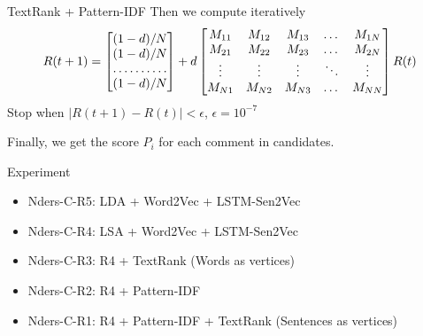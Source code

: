 \documentclass[aspectratio=169]{beamer}
\begin{document}
    \begin{frame}{TextRank + Pattern-IDF}
      Then we compute iteratively
      \[
      R(t+1) = 
      \begin{bmatrix}
          (1-d)/N       \\
          (1-d)/N       \\
          \hdotsfor{1} \\
          (1-d)/N       
      \end{bmatrix}
      +d
      \begin{bmatrix}
          M_{11} & M_{12} & M_{13} & \dots  & M_{1N} \\
          M_{21} & M_{22} & M_{23} & \dots  & M_{2N} \\
          \vdots & \vdots & \vdots & \ddots & \vdots \\
          M_{N1} & M_{N2} & M_{N3} & \dots  & M_{NN}
      \end{bmatrix}
      R(t)
      \]
      Stop when $|R(t+1)-R(t)|<\epsilon$, $\epsilon = 10^{-7}$

      Finally, we get the score $P_i$ for each comment in candidates. 
    \end{frame}

  \begin{frame}{Experiment}
    \begin{itemize}
      \item{Nders-C-R5: } LDA + Word2Vec + LSTM-Sen2Vec 
      \item{Nders-C-R4: } LSA + Word2Vec + LSTM-Sen2Vec 
      \item{Nders-C-R3: } R4 + TextRank (Words as vertices)
      \item{Nders-C-R2: } R4 + Pattern-IDF 
      \item{Nders-C-R1: } R4 + Pattern-IDF + TextRank (Sentences as vertices)
    \end{itemize}
  \end{frame}
\end{document}
